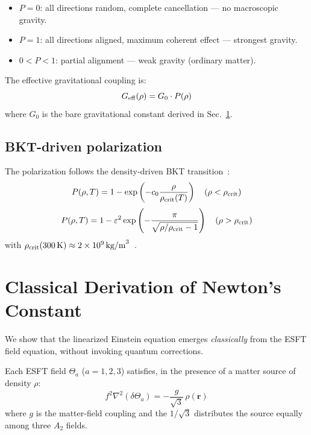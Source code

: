 ﻿\documentclass[twocolumn,preprintnumbers,amsmath,amssymb,prd]{revtex4-2}
\begin{document}
\begin{itemize}
\item $P = 0$: all directions random, complete cancellation --- no macroscopic gravity.
\item $P = 1$: all directions aligned, maximum coherent effect --- strongest gravity.
\item $0 < P < 1$: partial alignment --- weak gravity (ordinary matter).
\end{itemize}

The effective gravitational coupling is:
\begin{equation}
G_{\rm eff}(\rho) = G_0 \cdot P(\rho)
\label{eq:Geff}
\end{equation}
where $G_0$ is the bare gravitational constant derived in Sec.~\ref{sec:classical}.

\subsection{BKT-driven polarization}

The polarization follows the density-driven BKT transition~\cite{Paper4}:
\begin{equation}
P(\rho, T) = 1 - \exp\left(-c_0\frac{\rho}{\rho_{\rm crit}(T)}\right) \quad (\rho < \rho_{\rm crit})
\label{eq:P_below}
\end{equation}
\begin{equation}
P(\rho, T) = 1 - \varepsilon^2\exp\left(-\frac{\pi}{\sqrt{\rho/\rho_{\rm crit} - 1}}\right) \quad (\rho > \rho_{\rm crit})
\label{eq:P_above}
\end{equation}
with $\rho_{\rm crit}(300\,\text{K}) \approx 2 \times 10^9\,\text{kg/m}^3$~\cite{Paper4}.

\section{Classical Derivation of Newton's Constant}
\label{sec:classical}

We show that the linearized Einstein equation emerges \emph{classically} from the ESFT field equation, without invoking quantum corrections.

Each ESFT field $\Theta_a$ ($a = 1,2,3$) satisfies, in the presence of a matter source of density $\rho$:
\begin{equation}
f^2 \nabla^2(\delta\Theta_a) = -\frac{g}{\sqrt{3}}\,\rho(\mathbf{r})
\label{eq:field_eq}
\end{equation}
where $g$ is the matter-field coupling and the $1/\sqrt{3}$ distributes the source equally among three $A_2$ fields.
\end{document}
